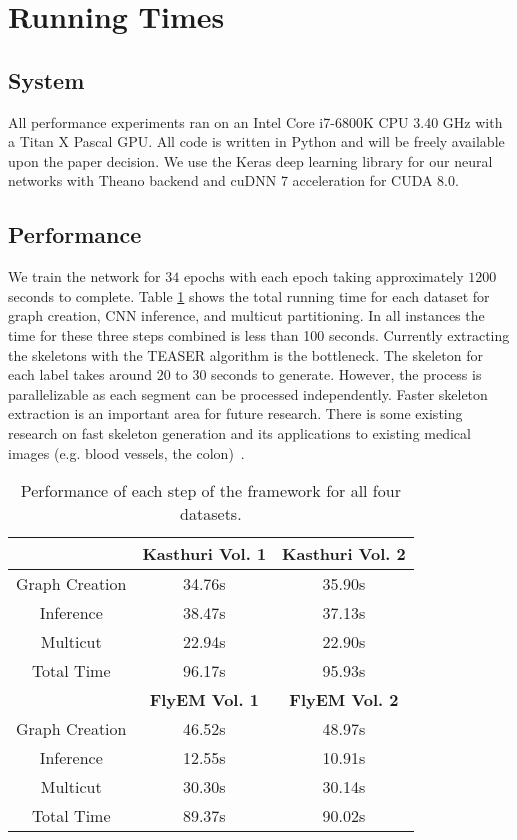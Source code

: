 \section{Running Times}

\subsection{System}

All performance experiments ran on an Intel Core i7-6800K CPU 3.40 GHz with a Titan X Pascal GPU. 
All code is written in Python and will be freely available upon the paper decision.
We use the Keras deep learning library for our neural networks with Theano backend and cuDNN 7 acceleration for CUDA 8.0. 

\subsection{Performance}

We train the network for $34$ epochs with each epoch taking approximately $1200$ seconds to complete.
Table \ref{table:performance} shows the total running time for each dataset for graph creation, CNN inference, and multicut partitioning. 
In all instances the time for these three steps combined is less than 100 seconds.
Currently extracting the skeletons with the TEASER algorithm is the bottleneck.
The skeleton for each label takes around $20$ to $30$ seconds to generate. 
However, the process is parallelizable as each segment can be processed independently.
Faster skeleton extraction is an important area for future research.
There is some existing research on fast skeleton generation and its applications to existing medical images (e.g. blood vessels, the colon)~\cite{palagyi2001sequential}.

\begin{table}[t]
	\centering
	\small
	\begin{tabular}{c c c } \hline
		& \textbf{Kasthuri Vol. 1} & \textbf{Kasthuri Vol. 2} \\ \hline
		Graph Creation & 34.76s & 35.90s \\
		Inference & 38.47s & 37.13s \\
		Multicut & 22.94s & 22.90s \\ \hline
		Total Time & 96.17s & 95.93s \\ \hline
		& \textbf{FlyEM Vol. 1} & \textbf{FlyEM Vol. 2} \\ \hline
		Graph Creation & 46.52s & 48.97s \\
		Inference & 12.55s & 10.91s \\
		Multicut & 30.30s & 30.14s \\ \hline
		Total Time & 89.37s & 90.02s \\ \hline
	\end{tabular}
	\caption{Performance of each step of the framework for all four datasets.}
	\label{table:performance}
\end{table}